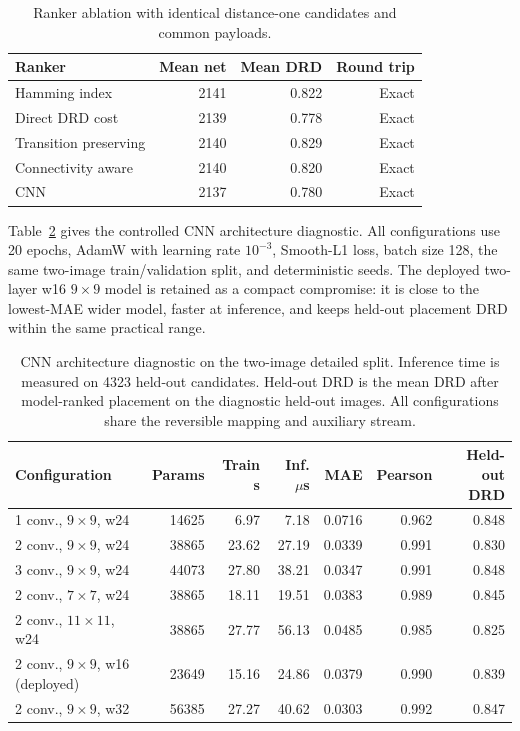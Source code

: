 \documentclass[a4paper,fleqn]{cas-dc}
\begin{document}
\begin{table}[t]
\centering
\caption{Ranker ablation with identical distance-one candidates and common
payloads.}
\label{tab:ranker-ablation}
\begin{tabular}{@{}lrrr@{}}
\toprule
\textbf{Ranker} & \textbf{Mean net} & \textbf{Mean DRD} &
\textbf{Round trip} \\
\midrule
Hamming index & 2141 & 0.822 & Exact \\
Direct DRD cost & 2139 & 0.778 & Exact \\
Transition preserving & 2140 & 0.829 & Exact \\
Connectivity aware & 2140 & 0.820 & Exact \\
CNN & 2137 & 0.780 & Exact \\
\bottomrule
\end{tabular}
\end{table}

Table~\ref{tab:cnn-architecture-ablation} gives the controlled CNN
architecture diagnostic. All configurations use 20 epochs, AdamW with learning
rate $10^{-3}$, Smooth-L1 loss, batch size 128, the same two-image
train/validation split, and deterministic seeds. The deployed two-layer
w16 $9\times9$ model is retained as a compact compromise: it is close to the
lowest-MAE wider model, faster at inference, and keeps held-out placement DRD
within the same practical range.

\begin{table}[t]
\centering
\caption{CNN architecture diagnostic on the two-image detailed split. Inference
time is measured on 4323 held-out candidates. Held-out DRD is the mean DRD
after model-ranked placement on the diagnostic held-out images. All
configurations share the reversible mapping and auxiliary stream.}
\label{tab:cnn-architecture-ablation}
\begin{tabular*}{\textwidth}{@{\extracolsep{\fill}}lrrrrrr@{}}
\toprule
\textbf{Configuration} & \textbf{Params} & \textbf{Train s} &
\textbf{Inf. $\mu$s} & \textbf{MAE} & \textbf{Pearson} &
\textbf{Held-out DRD} \\
\midrule
1 conv., $9\times9$, w24 & 14625 & 6.97 & 7.18 & 0.0716 & 0.962 & 0.848 \\
2 conv., $9\times9$, w24 & 38865 & 23.62 & 27.19 & 0.0339 & 0.991 & 0.830 \\
3 conv., $9\times9$, w24 & 44073 & 27.80 & 38.21 & 0.0347 & 0.991 & 0.848 \\
2 conv., $7\times7$, w24 & 38865 & 18.11 & 19.51 & 0.0383 & 0.989 & 0.845 \\
2 conv., $11\times11$, w24 & 38865 & 27.77 & 56.13 & 0.0485 & 0.985 & 0.825 \\
2 conv., $9\times9$, w16 (deployed) & 23649 & 15.16 & 24.86 & 0.0379 & 0.990 & 0.839 \\
2 conv., $9\times9$, w32 & 56385 & 27.27 & 40.62 & 0.0303 & 0.992 & 0.847 \\
\bottomrule
\end{tabular*}
\end{table}
\end{document}
